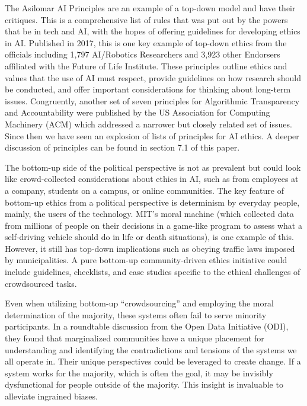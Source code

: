 \documentclass{svproc}
\begin{document}
The Asilomar AI Principles \cite{2022AIInstitute}  are an example of a top-down model and have their critiques. This is a comprehensive list of rules that was put out by the powers that be in tech and AI, with the hopes of offering guidelines for developing ethics in AI. Published in 2017, this is one key example of top-down ethics from the officials including 1,797 AI/Robotics Researchers and 3,923 other Endorsers affiliated with the Future of Life Institute. These principles outline ethics and values that the use of AI must respect, provide guidelines on how research should be conducted, and offer important considerations for thinking about long-term issues. \cite{2022AIInstitute} Congruently, another set of seven principles for Algorithmic Transparency and Accountability were published by the US Association for Computing Machinery (ACM) which addressed a narrower but closely related set of issues. \cite{Whittlestone2019TheEthics}  Since then we have seen an explosion of lists of principles for AI ethics. A deeper discussion of principles can be found in section 7.1 of this paper. 

The bottom-up side of the political perspective is not as prevalent but could look like crowd-collected considerations about ethics in AI, such as from employees at a company, students on a campus, or online communities. The key feature of bottom-up ethics from a political perspective is determinism by everyday people, mainly, the users of the technology. MIT’s moral machine (which collected data from millions of people on their decisions in a game-like program to assess what a self-driving vehicle should do in life or death situations), is one example of this. \cite{Awad2018TheExperiment} However, it still has top-down implications such as obeying traffic laws imposed by municipalities. A pure bottom-up community-driven ethics initiative could include guidelines, checklists, and case studies specific to the ethical challenges of crowdsourced tasks. \cite{Shmueli2021BeyondCrowdsourcing} 

Even when utilizing bottom-up “crowdsourcing” and employing the moral determination of the majority, these systems often fail to serve minority participants. In a roundtable discussion from the Open Data Initiative (ODI), \cite{ExperimentalismDocs.}  they found that marginalized communities have a unique placement for understanding and identifying the contradictions and tensions of the systems we all operate in. Their unique perspectives could be leveraged to create change. If a system works for the majority, which is often the goal, it may be invisibly dysfunctional for people outside of the majority. This insight is invaluable to alleviate ingrained biases. 
\end{document}
